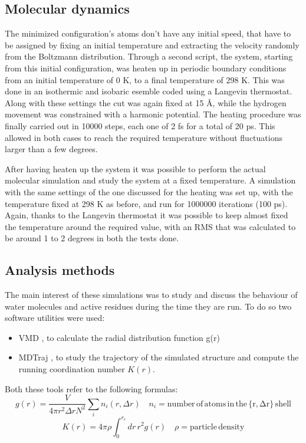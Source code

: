 \documentclass[12pt]{article}
\begin{document}
\subsection{Molecular dynamics}
The minimized configuration's atoms don't have any initial speed, that have to be assigned by fixing an initial temperature and extracting the velocity randomly from the Boltzmann distribution. Through a second script, the system, starting from this initial configuration, was heaten up in periodic boundary conditions from an initial temperature of 0 K, to a final temperature of 298 K. This was done in an isothermic and isobaric esemble coded using a Langevin thermostat. Along with these settings the cut was again fixed at 15 \AA, while the hydrogen movement was constrained with a harmonic potential.
The heating procedure was finally carried out in 10000 steps, each one of 2 fs for a total of 20 ps. This allowed in both cases to reach the required temperature without fluctuations larger than a few degrees.


After having heaten up the system it was possible to perform the actual molecular simulation and study the system at a fixed temperature. A simulation with the same settings of the one discussed for the heating was set up, with the temperature fixed at 298 K as before, and run for 1000000 iterations (100 ps).
Again, thanks to the Langevin thermostat it was possible to keep almost fixed the temperature around the required value, with an RMS that was calculated to be around 1 to 2 degrees in both the tests done.

\subsection{Analysis methods}
The main interest of these simulations was to study and discuss the behaviour of water molecules and active residues during the time they are run. To do so two software utilities were used:
\begin{itemize}
    \item VMD \cite{VMD}, to calculate the radial distribution function g(r)
    \item MDTraj \cite{MDTraj}, to study the trajectory of the simulated structure and compute the running coordination number $K(r)$.
\end{itemize}

Both these tools refer to the following formulas:
\begin{equation}
    g(r) = \frac{V}{4\pi r^2 \Delta r N^2}\sum_i n_i(r,\Delta r) \quad n_i = \mathrm{number \, of \, atoms \, in \, the \, \{r,\Delta r\} \, shell}
    \label{eq:gofr}
\end{equation}
\begin{equation}
    K(r) = 4\pi \rho \int_{0}^{r_c} dr \, r^2 g(r) \quad \rho = \mathrm{particle \, density}
    \label{eq:kofr}
\end{equation}
\end{document}
